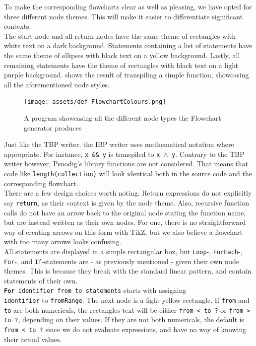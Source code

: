 To make the corresponding flowcharts clear as well as pleasing, we have opted for three different node themes. This will make it easier to differentiate significant contexts. \\

The start node and all return nodes have the same theme of rectangles with white text on a dark background. Statements containing a list of statements have the same theme of ellipses with black text on a yellow background. Lastly, all remaining statements have the theme of rectangles with black text on a light purple background.  shows the result of transpiling a simple function, showcasing all the aforementioned node styles. \\

\begin{figure}[ht]
    \centering
    \texttt{[image: assets/def\_FlowchartColours.png]}
    \caption{A program showcasing all the different node types the Flowchart generator produces}
    \label{flowchartColours}
\end{figure}

Just like the TBP writer, the IBP writer uses mathematical notation where appropriate. For instance, \texttt{x \&\& y} is transpiled to \texttt{x $\land$ y}. Contrary to the TBP writer however, Psnodig's library functions are not considered. That means that code like \texttt{length(collection)} will look identical both in the source code and the corresponding flowchart. \\

There are a few design choices worth noting. Return expressions do not explicitly say \texttt{return}, as their context is given by the node theme. Also, recursive function calls do not have an arrow back to the original node stating the function name, but are instead written as their own nodes. For one, there is no straightforward way of creating arrows on this form with TikZ, but we also believe a flowchart with too many arrows looks confusing. \\

All statements are displayed in a simple rectangular box, but \texttt{Loop}-, \texttt{ForEach}-, \texttt{For}-, and \texttt{If}-statements are - as previously mentioned - given their own node themes. This is because they break with the standard linear pattern, and contain statements of their own. \\

\texttt{\textbf{For} identifier from to statements} starts with assigning \\ \texttt{identifier} to \texttt{fromRange}. The next node is a light yellow rectangle. If \texttt{from} and \texttt{to} are both numericals, the rectangles text will be either \texttt{from < to ?} or \texttt{from > to ?}, depending on their values. If they are not both numericals, the default is \texttt{from < to ?} since we do not evaluate expressions, and have no way of knowing their actual values. \\

